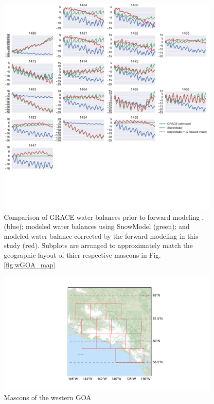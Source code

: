 \documentclass[review]{igs}
\begin{document}
\begin{figure}
\noindent\includegraphics[width=178mm]{figures/westernPlot} \centering \caption{Comparison of GRACE water balances prior to forward modeling \citep{luthcke_antarctica_2013}, (blue); modeled water balances using SnowModel \citep{beamer_high-resolution_2016} (green); and modeled water balance corrected by the forward modeling in this study (red). Subplots are arranged to approximately match the geographic layout of thier respective mascons in Fig. \ref{fig:wGOA_map}} \label{fig:wGOA_plot}
\end{figure}

\begin{figure}
\noindent\includegraphics[width=178mm]{figures/easternMap} \centering \caption{Mascons of the western GOA} \label{fig:summer}
\end{figure}
\end{document}
